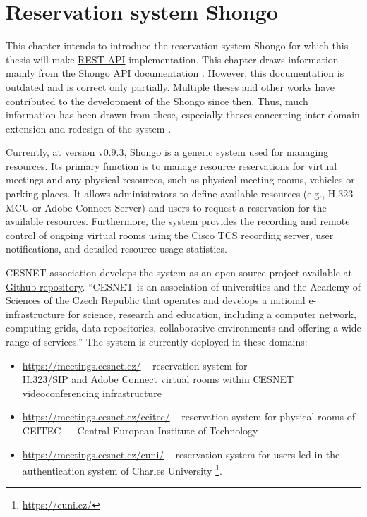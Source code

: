 \chapter{Reservation system Shongo}
This chapter intends to introduce the reservation system Shongo for which this thesis will make \hyperref[rest]{REST API} implementation.
This chapter draws information mainly from the Shongo API documentation . However, this documentation is outdated and is correct only partially. Multiple theses and other works have contributed to the development of the Shongo since then. Thus, much information has been drawn from these, especially theses concerning inter-domain extension  and redesign of the system .

Currently, at version v0.9.3, Shongo is a generic system used for managing resources.
Its primary function is to manage resource reservations for virtual meetings and any physical resources, such as physical meeting rooms, vehicles or parking places.
It allows administrators to define available resources (e.g., H.323 MCU or Adobe Connect Server) and users to request a reservation for the available resources.
Furthermore, the system provides the recording and remote control of ongoing virtual rooms using the Cisco TCS recording server, user notifications, and detailed resource usage statistics.
\cite{shongo}

CESNET association develops the system as an open-source project available at \href{https://github.com/shongo/shongo}{Github repository}.
\enquote{CESNET is an association of universities and the Academy of Sciences of the Czech Republic that operates and develops a national e-infrastructure for science, research and education, including a computer network, computing grids, data repositories, collaborative environments and offering a wide range of services.} \cite{cesnet}
The system is currently deployed in these domains:
\begin{itemize}
    \item \url{https://meetings.cesnet.cz/} -- reservation system for \\
    H.323/SIP and Adobe Connect virtual rooms within CESNET videoconferencing infrastructure
    \item \url{https://meetings.cesnet.cz/ceitec/} -- reservation system for physical rooms of CEITEC --- Central European Institute of Technology
    \item \url{https://meetings.cesnet.cz/cuni/} -- reservation system for users led in the authentication system of Charles University \footnote{\url{https://cuni.cz/}}.
\end{itemize}


